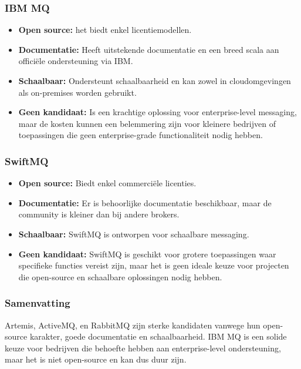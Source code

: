 \subsubsection{IBM MQ}
\begin{itemize}
    \item \textbf{Open source:} het biedt enkel licentiemodellen.
    \item \textbf{Documentatie:} Heeft uitstekende documentatie en een breed scala aan officiële ondersteuning via IBM.
    \item \textbf{Schaalbaar:} Ondersteunt schaalbaarheid en kan zowel in cloudomgevingen als on-premises worden gebruikt.
    \item \textbf{Geen kandidaat:} Is een krachtige oplossing voor enterprise-level messaging, maar de kosten kunnen een belemmering zijn voor kleinere bedrijven of toepassingen die geen enterprise-grade functionaliteit nodig hebben.
\end{itemize}

\subsubsection{SwiftMQ}
\begin{itemize}
    \item \textbf{Open source:} Biedt enkel commerciële licenties.
    \item \textbf{Documentatie:} Er is behoorlijke documentatie beschikbaar, maar de community is kleiner dan bij andere brokers.
    \item \textbf{Schaalbaar:} SwiftMQ is ontworpen voor schaalbare messaging.
    \item \textbf{Geen kandidaat:} SwiftMQ is geschikt voor grotere toepassingen waar specifieke functies vereist zijn, maar het is geen ideale keuze voor projecten die open-source en schaalbare oplossingen nodig hebben.
\end{itemize}

\subsubsection{Samenvatting}
Artemis, ActiveMQ, en RabbitMQ zijn sterke kandidaten vanwege hun open-source karakter, goede documentatie en schaalbaarheid.
IBM MQ is een solide keuze voor bedrijven die behoefte hebben aan enterprise-level ondersteuning, maar het is niet open-source en kan dus duur zijn.


